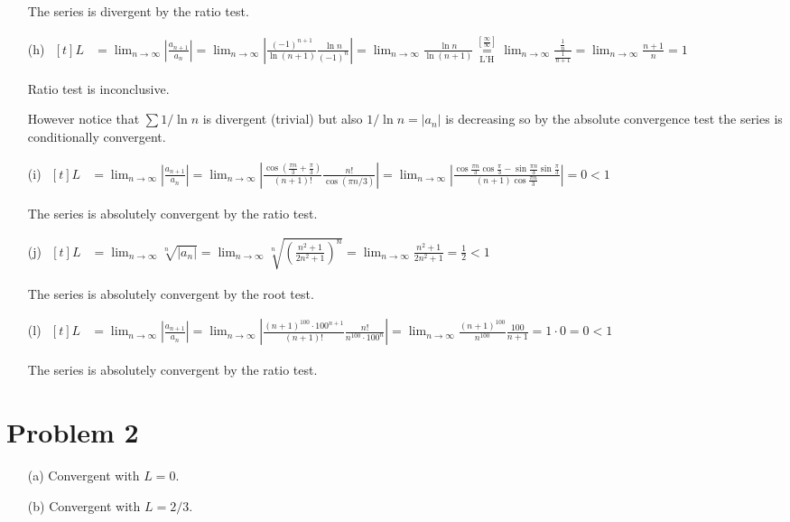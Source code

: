 \documentclass[preview, margin=0.6in]{standalone}
\newcommand*{\problem}[1]{\section*{Problem #1}}
\newcommand*{\lheqinfty}{\ensuremath{\underset{\text{L'H}}{\overset{\left[\frac{\infty}{\infty}\right]}{=}}}}
\begin{document}
\begin{itemize}
	The series is divergent by the ratio test.

\item[(h)]
	$\begin{aligned}[t]
		L
		&=\lim_{n\to\infty}\left|\frac{a_{n+1}}{a_n}\right|
		=\lim_{n\to\infty}\left|\frac{(-1)^{n+1}}{\ln(n+1)}\frac{\ln n}{(-1)^n}\right|
		=\lim_{n\to\infty}\frac{\ln n}{\ln (n+1)}
		\lheqinfty \lim_{n\to\infty}\frac{\frac1n}{\frac{1}{n+1}}
		=\lim_{n\to\infty}\frac{n+1}{n}
		=1
	\end{aligned}$

	Ratio test is inconclusive.

	However notice that $\sum 1/\ln n$ is divergent (trivial) but also $1/\ln n=\left|a_n\right|$ is decreasing so by the absolute convergence test the series is conditionally convergent.

\item[(i)]
	$\begin{aligned}[t]
		L
		&=\lim_{n\to\infty}\left|\frac{a_{n+1}}{a_n}\right|
		=\lim_{n\to\infty}\left|\frac{\cos\left(\frac{\pi n}{3}+\frac{\pi}{3}\right)}{(n+1)!}\frac{n!}{\cos(\pi n/3)}\right|
		=\lim_{n\to\infty}\left|\frac{\cos \frac{\pi n}{3}\cos \frac{\pi}{3}-\sin \frac{\pi n}{3}\sin \frac{\pi}{3}}{(n+1)\cos \frac{\pi n}{3}}\right|
		=0<1
	\end{aligned}$

	The series is absolutely convergent by the ratio test.

\item[(j)]
	$\begin{aligned}[t]
		L 
		&=\lim_{n\to\infty}\sqrt[n]{\left|a_n\right|}
		=\lim_{n\to\infty}\sqrt[n]{\left(\frac{n^2+1}{2n^2+1}\right)^n}
		=\lim_{n\to\infty}\frac{n^2+1}{2n^2+1}
		=\frac12 
		<1
	\end{aligned}$

	The series is absolutely convergent by the root test.

\item[(l)]
	$\begin{aligned}[t]
		L
		&=\lim_{n\to\infty}\left|\frac{a_{n+1}}{a_n}\right|
		=\lim_{n\to\infty}\left|\frac{(n+1)^{100}\cdot 100^{n+1}}{(n+1)!}\frac{n!}{n^{100}\cdot 100^n}\right|
		=\lim_{n\to\infty}\frac{(n+1)^{100}}{n^{100}}\frac{100}{n+1}
		=1\cdot0=0<1
	\end{aligned}$

	The series is absolutely convergent by the ratio test.
\end{itemize}

\problem{2}
\begin{itemize}
	\item[(a)] Convergent with $L=0$.
	\item[(b)] Convergent with $L=2/3$.
\end{itemize}
\end{document}

